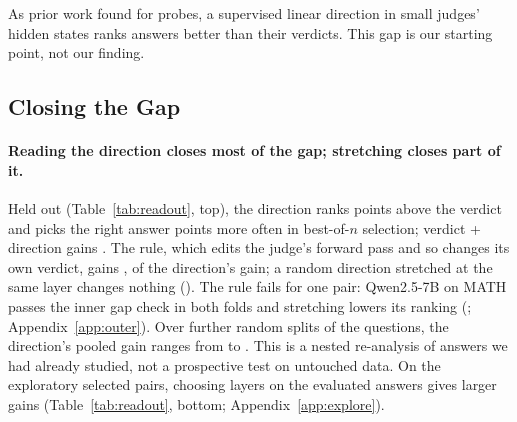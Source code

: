 \documentclass[11pt]{article}
\newcounter{takeaway}
\begin{document}
\begin{takeaway}
As prior work found for probes, a supervised linear direction in small judges' hidden states ranks answers better than their verdicts. This gap is our starting point, not our finding.
\end{takeaway}

\subsection{Closing the Gap}
\label{sec:close}

\begin{table}[t]
\centering
\small

\caption{Gains over the verdict on the full answer pools (equal-weight means over judge--benchmark pairs; bold: 95\% interval above 0). Top: the primary evaluation, every choice made on training questions and evaluated on held-out questions; the stretch column is the rule (stretch if the inner gap exceeds 5 points, else the verdict); reasoning first is on the  of these pairs with a reasoning run. Bottom: the exploratory  pairs with an in-sample gap above 5 points, layer and stretch layer chosen on the evaluated answers (descriptive). Rank: ranking ($\times$100). BoN: best-of-$n$ accuracy, the share of questions with a right and a wrong answer where the top-scored answer is right. $^\ddagger$Questions the judge answered wrong on its one sampled attempt (held out:  pairs with such labels).}
\label{tab:readout}
\end{table}

\paragraph{Reading the direction closes most of the gap; stretching closes part of it.} Held out (Table~\ref{tab:readout}, top), the direction ranks  points above the verdict and picks the right answer  points more often in best-of-$n$ selection; verdict + direction gains . The rule, which edits the judge's forward pass and so changes its own verdict, gains ,  of the direction's gain; a random direction stretched at the same layer changes nothing (). The rule fails for one pair: Qwen2.5-7B on MATH passes the inner gap check in both folds and stretching lowers its ranking (; Appendix~\ref{app:outer}). Over  further random splits of the questions, the direction's pooled gain ranges from  to . This is a nested re-analysis of answers we had already studied, not a prospective test on untouched data. On the exploratory selected pairs, choosing layers on the evaluated answers gives larger gains (Table~\ref{tab:readout}, bottom; Appendix~\ref{app:explore}).
\end{document}
